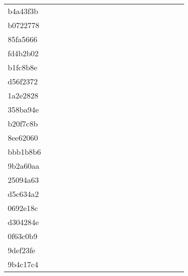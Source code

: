 \begin{table*}[htb]
\begin{tabular}{l|cccccccccccccccccc}
b4a43f3b  & \C & \X & \X & \X & \X & \X & \X & \X & \X & \X & \X & \X & \X & \C & \C & \X & \X \\
b0722778  & \C & \X & \X & \X & \X & \X & \X & \X & \X & \X & \X & \X & \X & \C & \C & \X & \X \\
85fa5666  & \C & \X & \X & \X & \X & \X & \X & \X & \X & \X & \X & \X & \X & \C & \C & \X & \X \\
fd4b2b02  & \C & \X & \X & \X & \X & \X & \X & \X & \X & \X & \X & \X & \X & \C & \C & \X & \X \\
b1fc8b8e  & \C & \X & \C & \X & \X & \C & \X & \X & \C & \X & \X & \C & \X & \C & \C & \C & \C \\
d56f2372  & \C & \X & \X & \X & \X & \X & \X & \X & \X & \X & \X & \X & \C & \C & \C & \X & \X \\
1a2e2828  & \C & \C & \C & \C & \C & \C & \C & \C & \X & \C & \C & \C & \C & \C & \C & \C & \C \\
358ba94e  & \C & \X & \X & \X & \X & \X & \X & \C & \X & \C & \X & \X & \C & \C & \C & \C & \C \\
b20f7c8b  & \C & \X & \X & \X & \X & \X & \X & \X & \X & \X & \X & \X & \X & \C & \C & \X & \X \\
8ee62060  & \C & \X & \C & \C & \X & \C & \C & \C & \X & \X & \X & \C & \C & \C & \C & \C & \C \\
bbb1b8b6  & \C & \X & \C & \X & \X & \X & \X & \X & \C & \X & \C & \X & \C & \C & \C & \C & \C \\
9b2a60aa  & \C & \X & \X & \X & \X & \X & \X & \X & \X & \X & \X & \X & \X & \C & \C & \X & \X \\
25094a63  & \X & \X & \X & \X & \X & \X & \X & \X & \X & \X & \X & \X & \X & \X & \X & \X & \X \\
d5c634a2  & \C & \X & \C & \X & \X & \X & \X & \X & \X & \X & \X & \X & \X & \C & \C & \C & \X \\
0692e18c  & \C & \X & \X & \X & \X & \X & \X & \X & \X & \X & \X & \X & \X & \C & \C & \C & \X \\
d304284e  & \C & \X & \X & \X & \X & \X & \X & \X & \X & \X & \X & \X & \X & \C & \C & \X & \X \\
0f63c0b9  & \C & \X & \X & \X & \X & \C & \X & \X & \X & \X & \X & \C & \C & \C & \C & \C & \C \\
9def23fe  & \C & \X & \X & \X & \X & \X & \X & \X & \X & \X & \X & \X & \X & \C & \C & \C & \C \\
9b4c17c4  & \C & \X & \C & \X & \X & \X & \X & \C & \X & \C & \X & \C & \C & \C & \C & \C & \C \\

\end{tabular}
\end{table*}
